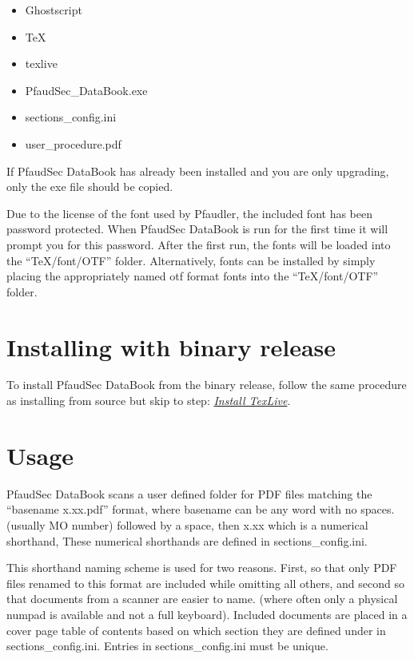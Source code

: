 \documentclass[14pt]{article}
\newcommand{\ifolder}{\item[\faFolderOpen]}
\newcommand{\ifile}{\item[\faFileText]}
\begin{document}
\begin{flushleft}
\begin{enumerate}
\begin{tcolorbox}[boxrule=0.5pt, colback=backgrey, colframe=bordergrey, sharpish corners]
\begin{itemize}[labelsep = 1.5em, align=center]

\ifolder Ghostscript
\ifolder TeX
\ifolder texlive
\ifile PfaudSec\_DataBook.exe
\ifile sections\_config.ini
\ifile user\_procedure.pdf

\end{itemize}
\end{tcolorbox}

If PfaudSec DataBook has already been installed and you are only upgrading, only the exe file should be copied.

Due to the license of the font used by Pfaudler, the included font has been password protected.
When PfaudSec DataBook is run for the first time it will prompt you for this password.
After the first run, the fonts will be loaded into the ``TeX/font/OTF'' folder.
Alternatively, fonts can be installed by simply placing the appropriately named otf format fonts into the ``TeX/font/OTF'' folder.


\end{enumerate}
\section{Installing with binary release}
To install PfaudSec DataBook from the binary release, follow the same procedure as installing from source but skip to step:
\hyperref[sec:depends]{\textit{Install TexLive}}.

\section{Usage}
\setlength{\parindent}{0.2in}
PfaudSec DataBook scans a user defined folder for PDF files matching the ``basename x.xx.pdf''
format, where basename can be any word with no spaces. (usually MO number) followed by a space, then x.xx which is a numerical shorthand,
These numerical shorthands are defined in sections\_config.ini.

This shorthand naming scheme is used for two reasons. First, so that only PDF files renamed to this format are included while omitting all others, and second so that documents from a scanner are easier to name.
(where often only a physical numpad is available and not a full keyboard).
Included documents are placed in a cover page table of contents based on which section they are defined under in sections\_config.ini.
Entries in sections\_config.ini must be unique.

\begin{tcolorbox}[
coltitle=black, title=\centering Example sections\_config.ini,
boxrule=0.5pt, colback=backgrey, colframe=bordergrey, sharpish corners] 
\begin{verbatim}


\end{verbatim}
\end{tcolorbox}
\end{flushleft}
\end{document}
